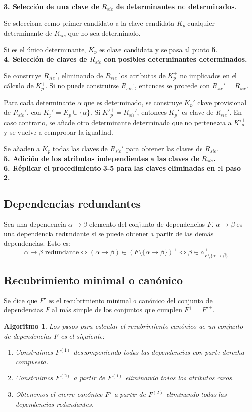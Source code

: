 \documentclass[12pt,a4paper]{article}
\theoremstyle{ejemplo}
\theoremstyle{algoritmo}
\newtheorem*{alg}{Algoritmo} %
\begin{document}
\textbf{3. Selección de una clave de $R_{sie}$ de determinantes no 
determinados.}

Se selecciona como primer candidato a la clave candidata $K_p$ cualquier
determinante de $R_{sie}$ que no sea determinado.

Si es el único determinante, $K_p$ es clave candidata y se pasa al punto 
\textbf{5}.
\\

\textbf{4. Selección de claves de $R_{sie}$ con posibles determinantes  
determinados.}

Se construye $R_{sie}'$, eliminando de $R_{sie}$ los atributos de $K_p^+$ no
implicados en el cálculo de $K_p^+$. Si no puede construirse $R_{sie}'$, 
entonces se procede con $R_{sie}'=R_{sie}$.

Para cada determinante $\alpha$ que es determinado, se construye $K_p'$ clave provisional de $R_{sie}'$, con $K_p'=K_p\cup\{\alpha\}$. Si ${K'}_{p}^{+}=
R_{sie}'$, entonces $K_p'$ es clave de $R_{sie}'$. En caso contrario, se añade
otro determinante determinado que no pertenezca a ${K'}_{p}^{+}$ y se vuelve 
a comprobar la igualdad.

Se añaden a $K_p$ todas las claves de $R_{sie}'$ para obtener las claves de 
$R_{sie}$.
\\

\textbf{5. Adición de los atributos independientes a las claves de $R_{sie}$.}
\\

\textbf{6. Réplicar el procedimiento 3-5 para las claves eliminadas en el paso 
2.}

\subsection*{Dependencias redundantes}
Sea una dependencia $\alpha\to\beta$ elemento del conjunto de dependencias $F$.
$\alpha\to\beta$ es una dependencia redundante si se puede obtener a partir de
las demás dependencias. Esto es:
$$\alpha\to\beta\text{ redundante}\iff(\alpha\to\beta)\in(F\setminus\{\alpha
\to\beta\})^+\iff\beta\in\alpha^+_{F\setminus\{\alpha\to\beta\}}$$

\subsection*{Recubrimiento minimal o canónico}
Se dice que $F'$ es el recubrimiento minimal o canónico del conjunto de
dependencias $F$ al más simple de los conjuntos que cumplen $F^+={F'}^+$.

\begin{alg}
Los pasos para calcular el recubrimiento canónico de un conjunto de dependencias
$F$ es el siguiente:
\begin{enumerate}[noitemsep]
	\item Construimos $F^{(1)}$ descomponiendo todas las dependencias con parte
	derecha compuesta.
	\item Construimos $F^{(2)}$ a partir de $F^{(1)}$ eliminando todos los
	atributos raros.
	\item Obtenemos el cierre canónico $F'$ a partir de $F^{(2)}$ eliminando
	todas las dependencias redundantes.
\end{enumerate}
\end{alg}
\end{document}
